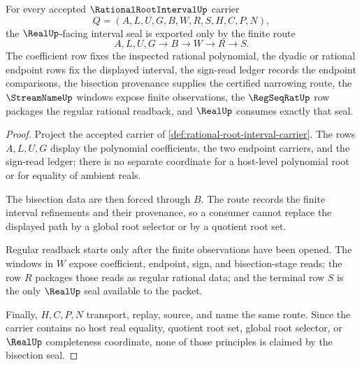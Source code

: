\begin{theorem}
\label{thm:rational-root-interval-bisection-seal}
For every accepted $\RationalRootIntervalUp$ carrier
$$
Q=(A,L,U,G,B,W,R,S,H,C,P,N),
$$
the $\RealUp$-facing interval seal is exported only by the finite route
$$
A,L,U,G \longrightarrow B \longrightarrow W \longrightarrow R \longrightarrow S .
$$
The coefficient row fixes the inspected rational polynomial, the dyadic or rational endpoint rows fix the displayed interval, the sign-read ledger records the endpoint comparisons, the bisection provenance supplies the certified narrowing route, the $\StreamNameUp$ windows expose finite observations, the $\RegSeqRatUp$ row packages the regular rational readback, and $\RealUp$ consumes exactly that seal.
\end{theorem}
\begin{proof}
Project the accepted carrier of \autoref{def:rational-root-interval-carrier}. The rows $A,L,U,G$ display the polynomial coefficients, the two endpoint carriers, and the sign-read ledger; there is no separate coordinate for a host-level polynomial root or for equality of ambient reals.

The bisection data are then forced through $B$. The route records the finite interval refinements and their provenance, so a consumer cannot replace the displayed path by a global root selector or by a quotient root set.

Regular readback starts only after the finite observations have been opened. The windows in $W$ expose coefficient, endpoint, sign, and bisection-stage reads; the row $R$ packages those reads as regular rational data; and the terminal row $S$ is the only $\RealUp$ seal available to the packet.

Finally, $H,C,P,N$ transport, replay, source, and name the same route. Since the carrier contains no host real equality, quotient root set, global root selector, or $\RealUp$ completeness coordinate, none of those principles is claimed by the bisection seal.
\end{proof}

